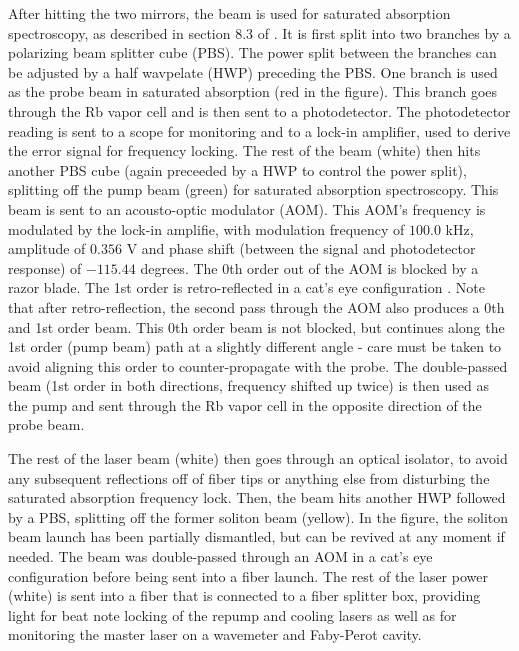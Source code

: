 After hitting the two mirrors, the beam is used for saturated absorption spectroscopy, as described in section 8.3 of \cite{Foot}. It is first split into two branches by a polarizing beam splitter cube (PBS). The power split between the branches can be adjusted by a half wavpelate (HWP) preceding the PBS. One branch is used as the probe beam in saturated absorption (red in the figure). This branch goes through the Rb vapor cell and is then sent to a photodetector. The photodetector reading is sent to a scope for monitoring and to a lock-in amplifier, used to derive the error signal for frequency locking.  The rest of the beam (white) then hits another PBS cube (again preceeded by a HWP to control the power split), splitting off the pump beam (green) for saturated absorption spectroscopy. This beam is sent to an acousto-optic modulator (AOM). This AOM's frequency is modulated by the lock-in amplifie, with modulation frequency of $100.0$ kHz, amplitude of $0.356$ V and phase shift (between the signal and photodetector response) of $-115.44$ degrees. The 0th order out of the AOM is blocked by a razor blade. The 1st order is retro-reflected in a cat's eye configuration \cite{Donley2005}. Note that after retro-reflection, the second pass through the AOM also produces a 0th and 1st order beam. This 0th order beam is not blocked, but continues along the 1st order (pump beam) path at a slightly different angle - care must be taken to avoid aligning this order to counter-propagate with the probe.   The double-passed beam (1st order in both directions, frequency shifted up twice) is then used as the pump and sent through the Rb vapor cell in the opposite direction of the probe beam.  

The rest of the laser beam (white) then goes through an optical isolator, to avoid any subsequent reflections off of fiber tips or anything else from disturbing the saturated absorption frequency lock. Then, the beam hits another HWP followed by a PBS, splitting off the former soliton beam (yellow). In the figure, the soliton beam launch has been partially dismantled, but can be revived at any moment if needed. The beam was double-passed through an AOM in a cat's eye configuration before being sent into a fiber launch. The rest of the laser power (white) is sent into a fiber that is connected to  a fiber splitter box, providing light for beat note locking of the \Rb{} repump and cooling lasers as well as for monitoring the master laser on a wavemeter and Faby-Perot cavity. 

